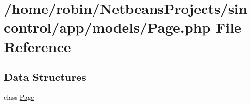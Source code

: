 \hypertarget{_page_8php}{}\section{/home/robin/\+Netbeans\+Projects/sincontrol/app/models/\+Page.php File Reference}
\label{_page_8php}
\subsection*{Data Structures}
\begin{DoxyCompactItemize}
\item 
class \hyperlink{class_page}{Page}
\end{DoxyCompactItemize}
